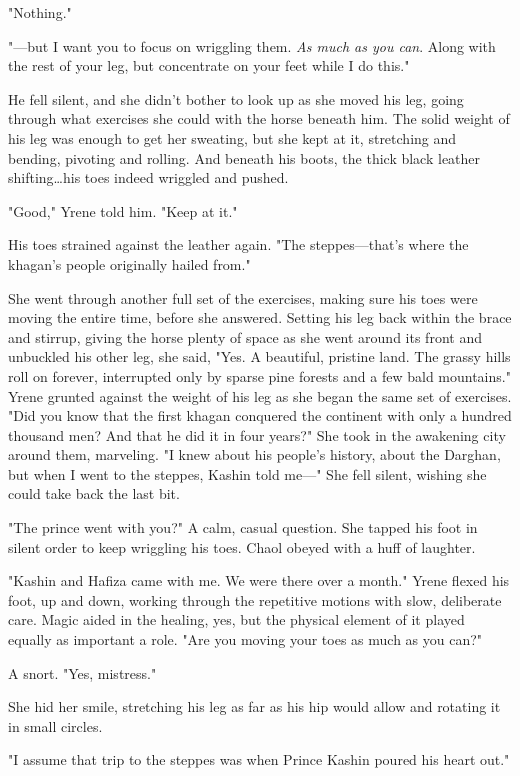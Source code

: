 "Nothing."

"---but I want you to focus on wriggling them.
\emph{As much as you can}.
Along with the rest of your leg, but concentrate on your feet while I do this."

He fell silent, and she didn't bother to look up as she moved his leg, going through what exercises she could with the horse beneath him.
The solid weight of his leg was enough to get her sweating, but she kept at it, stretching and bending, pivoting and rolling.
And beneath his boots, the thick black leather shifting\ldots his toes indeed wriggled and pushed.

"Good," Yrene told him.
"Keep at it."

His toes strained against the leather again.
"The steppes---that's where the khagan's people originally hailed from."

She went through another full set of the exercises, making sure his toes were moving the entire time, before she answered.
Setting his leg back within the brace and stirrup, giving the horse plenty of space as she went around its front and unbuckled his other leg, she said, "Yes.
A beautiful, pristine land.
The grassy hills roll on forever, interrupted only by sparse pine forests and a few bald mountains."
Yrene grunted against the weight of his leg as she began the same set of exercises.
"Did you know that the first khagan conquered the continent with only a hundred thousand men?
And that he did it in four years?"
She took in the awakening city around them, marveling.
"I knew about his people's history, about the Darghan, but when I went to the steppes, Kashin told me---" She fell silent, wishing she could take back the last bit.

"The prince went with you?"
A calm, casual question.
She tapped his foot in silent order to keep wriggling his toes.
Chaol obeyed with a huff of laughter.

"Kashin and Hafiza came with me.
We were there over a month."
Yrene flexed his foot, up and down, working through the repetitive motions with slow, deliberate care.
Magic aided in the healing, yes, but the physical element of it played equally as important a role.
"Are you moving your toes as much as you can?"

A snort.
"Yes, mistress."

She hid her smile, stretching his leg as far as his hip would allow and rotating it in small circles.

"I assume that trip to the steppes was when Prince Kashin poured his heart out."

